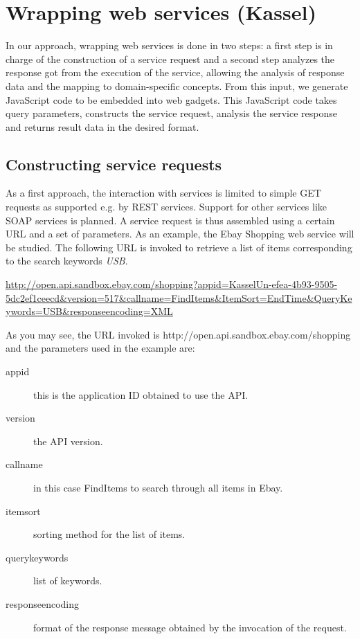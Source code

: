 
\section{Wrapping web services (Kassel)}
\label{sec:wrapping_web_services}

%
%
%
%

In our approach, wrapping web services is done in two steps: a first step is in charge of the construction of a service request and a second step analyzes the response got from the execution of the service, allowing the analysis of response data and the mapping to domain-specific concepts. From this input, we generate JavaScript code to be embedded into web gadgets. This JavaScript code takes query parameters, constructs the service request, analysis the service response and returns result data in the desired format. 

\subsection{Constructing service requests} %
\label{sub:constructing_service_requests}

As a first approach, the interaction with services is limited to simple GET requests as supported e.g. by REST services. Support for other services like SOAP services is planned. A service request is thus assembled using a certain URL and a set of parameters. As an example, the Ebay Shopping web service will be studied. The following URL is invoked to retrieve a list of items corresponding to the search keywords \emph{USB}.

\url{http://open.api.sandbox.ebay.com/shopping?appid=KasselUn-efea-4b93-9505-5dc2ef1ceecd&version=517&callname=FindItems&ItemSort=EndTime&QueryKeywords=USB&responseencoding=XML}

As you may see, the URL invoked is http://open.api.sandbox.ebay.com/shopping and the parameters used in the example are:
\begin{description}
	\item[appid] this is the application ID obtained to use the API.
	\item[version] the API version.
	\item[callname] in this case FindItems to search through all items in Ebay.
	\item[itemsort] sorting method for the list of items.
	\item[querykeywords] list of keywords.
	\item[responseencoding] format of the response message obtained by the invocation of the request.
\end{description}

